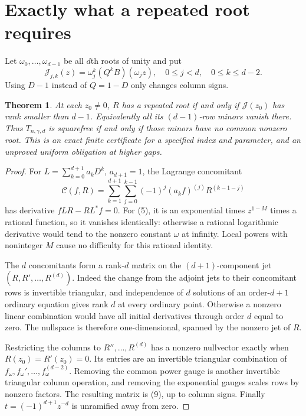 \documentclass[11pt]{article}
\newtheorem{theorem}{Theorem}
\begin{document}
\section{Exactly what a repeated root requires}
Let $\omega_0,\ldots,\omega_{d-1}$ be all $d$th roots of unity and put
\[
 \mathcal J_{j,k}(z)=\omega_j^k(Q^kB)(\omega_jz),
 \quad 0\le j<d,\quad 0\le k\le d-2.                       \tag{9}
\]
Using $D-1$ instead of $Q=1-D$ only changes column signs.
\begin{theorem}\label{thm:rank}
At each $z_0\ne0$, $R$ has a repeated root if and only if
$\mathcal J(z_0)$ has rank smaller than $d-1$.
Equivalently all its $(d-1)$-row minors vanish there.
Thus $T_{n,\gamma,d}$ is squarefree if and only if those minors have
no common nonzero root. This is an exact finite certificate for a
specified index and parameter, and an unproved uniform obligation at
higher gaps.
\end{theorem}
\begin{proof}
For $L=\sum_{k=0}^{d+1}a_kD^k$, $a_{d+1}=1$, the Lagrange concomitant
\[
 \mathcal C(f,R)=\sum_{k=1}^{d+1}\sum_{j=0}^{k-1}
                 (-1)^j(a_kf)^{(j)}R^{(k-1-j)}              \tag{10}
\]
has derivative $fLR-RL^*f=0$. For (5), it is an exponential times
$z^{1-M}$ times a rational function, so it vanishes identically:
otherwise a rational logarithmic derivative would tend to the nonzero
constant $\omega$ at infinity. Local powers with noninteger $M$ cause
no difficulty for this rational identity.

The $d$ concomitants form a rank-$d$ matrix on the $(d+1)$-component
jet $(R,R',\ldots,R^{(d)})$. Indeed the change from the adjoint jets
to their concomitant rows is invertible triangular, and independence
of $d$ solutions of an order-$d+1$ ordinary equation gives rank $d$
at every ordinary point. Otherwise a nonzero linear combination would
have all initial derivatives through order $d$ equal to zero.
The nullspace is therefore one-dimensional, spanned by the nonzero
jet of $R$.

Restricting the columns to $R'',\ldots,R^{(d)}$ has a nonzero nullvector
exactly when $R(z_0)=R'(z_0)=0$. Its entries are an invertible triangular
combination of $f_\omega,f_\omega',\ldots,f_\omega^{(d-2)}$.
Removing the common power gauge is another invertible triangular
column operation, and removing the exponential gauges scales rows by
nonzero factors. The resulting matrix is (9), up to column signs.
Finally $t=(-1)^{d+1}z^{-d}$ is unramified away from zero.
\end{proof}
\end{document}
